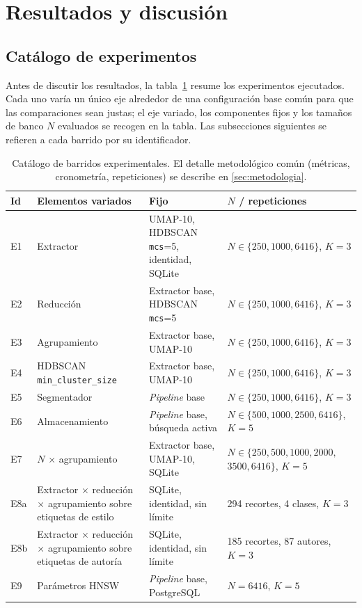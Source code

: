 \section{Resultados y discusión}
\label{sec:results}

\setlength{\emergencystretch}{6em}
\sloppy
\setlength{\tabcolsep}{4pt}

\subsection{Catálogo de experimentos}
\label{subsec:catalogo}
Antes de discutir los resultados, la tabla~\ref{tab:catalogo-experimentos}
resume los experimentos ejecutados. Cada uno varía un único eje alrededor de
una configuración base común para que las comparaciones sean justas; el eje
variado, los componentes fijos y los tamaños de banco $N$ evaluados se recogen
en la tabla. Las subsecciones siguientes se refieren a cada barrido por su
identificador.

\begin{table}[h]
  \centering
{\footnotesize
\begin{tabular}{|p{0.6cm}|p{3.9cm}|p{3.6cm}|p{4.7cm}|} \hline
  \textbf{Id} & \textbf{Elementos variados} & \textbf{Fijo} & \textbf{$N$ / repeticiones} \\ \hline
  E1 & Extractor & UMAP-10, HDBSCAN \texttt{mcs}=5, identidad, SQLite & $N\in\{250, 1000, 6416\}$, $K{=}3$ \\ \hline
  E2 & Reducción & Extractor base, HDBSCAN \texttt{mcs}=5 & $N\in\{250, 1000, 6416\}$, $K{=}3$ \\ \hline
  E3 & Agrupamiento & Extractor base, UMAP-10 & $N\in\{250, 1000, 6416\}$, $K{=}3$ \\ \hline
  E4 & HDBSCAN \texttt{min\_cluster\_size} & Extractor base, UMAP-10 & $N\in\{250, 1000, 6416\}$, $K{=}3$ \\ \hline
  E5 & Segmentador & \textit{Pipeline} base & $N\in\{250, 1000, 6416\}$, $K{=}3$ \\ \hline
  E6 & Almacenamiento & \textit{Pipeline} base, búsqueda activa & $N\in\{500, 1000, 2500, 6416\}$, $K{=}5$ \\ \hline
  E7 & $N$ $\times$ agrupamiento & Extractor base, UMAP-10, SQLite & $N\in\{250, 500, 1000, 2000,$ $3500, 6416\}$, $K{=}5$ \\ \hline
  E8a & Extractor $\times$ reducción $\times$ agrupamiento sobre etiquetas de estilo & SQLite, identidad, sin límite & 294 recortes, 4 clases, $K{=}3$ \\ \hline
  E8b & Extractor $\times$ reducción $\times$ agrupamiento sobre etiquetas de autoría & SQLite, identidad, sin límite & 185 recortes, 87 autores, $K{=}3$ \\ \hline
  E9 & Parámetros HNSW & \textit{Pipeline} base, PostgreSQL & $N{=}6416$, $K{=}5$ \\ \hline
\end{tabular}
}
  \caption[Catálogo de barridos experimentales]{Catálogo de barridos experimentales. El detalle metodológico común
  (métricas, cronometría, repeticiones) se describe en \ref{sec:metodologia}.}
  \label{tab:catalogo-experimentos}
\end{table}

